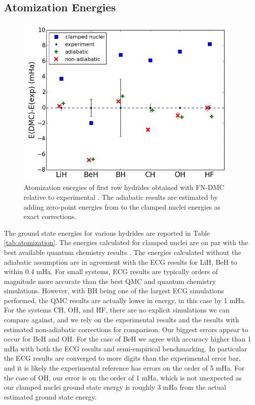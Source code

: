 \documentclass[pra,superscriptaddress,groupedaddress,twocolumn]{revtex4}
\begin{document}


\subsection{Atomization Energies}

\begin{figure}
\centering
\includegraphics[scale=.4]{Figures/atomization}
\caption{Atomization energies of first row hydrides obtained with FN-DMC relative to experimental . The adiabatic results are estimated by adding zero-point energies from \cite{Feller_Corrections} to the clamped nuclei energies as exact corrections.}
\end{figure}

The ground state energies for various hydrides are reported in Table \ref{tab:atomization}. The energies calculated for clamped nuclei are on par with the best available quantum chemistry results \cite{Adamowicz_LiH,Koput_BeH,Miliordos_BH}. The energies calculated without the adiabatic assumption are in agreement with the ECG results for LiH, BeH to within 0.4 mHa. For small systems, ECG results are typically orders of magnitude more accurate than the best QMC and quantum chemistry simulations. However, with BH being one of the largest ECG simulations performed, the QMC results are actually lower in energy, in this case by 1 mHa. For the systems CH, OH, and HF, there are no explicit simulations we can compare against, and we rely on the experimental results and the results with estimated non-adiabatic corrections for comparison. Our biggest errors appear to occur for BeH and OH. For the case of BeH we agree with accuracy higher than 1 mHa with both the ECG results and semi-empirical benchmarking. In particular the ECG results are converged to more digits than the experimental error bar, and it is likely the experimental reference has errors on the order of 5 mHa.   For the case of OH, our error is on the order of 1 mHa, which is not unexpected as our clamped nuclei ground state energy is roughly 3 mHa from the actual estimated ground state energy.
\end{document}
